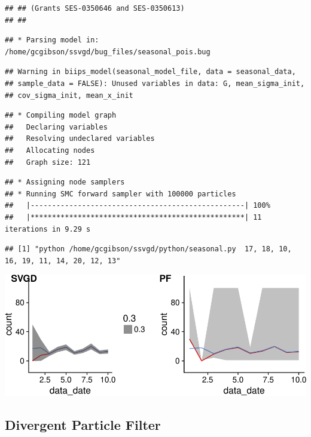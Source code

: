 \documentclass[]{article}
\begin{document}
\begin{verbatim}
## ## (Grants SES-0350646 and SES-0350613)
## ##
\end{verbatim}

\begin{verbatim}
## * Parsing model in: /home/gcgibson/ssvgd/bug_files/seasonal_pois.bug
\end{verbatim}

\begin{verbatim}
## Warning in biips_model(seasonal_model_file, data = seasonal_data,
## sample_data = FALSE): Unused variables in data: G, mean_sigma_init,
## cov_sigma_init, mean_x_init
\end{verbatim}

\begin{verbatim}
## * Compiling model graph
##   Declaring variables
##   Resolving undeclared variables
##   Allocating nodes
##   Graph size: 121
\end{verbatim}

\begin{verbatim}
## * Assigning node samplers
## * Running SMC forward sampler with 100000 particles
##   |--------------------------------------------------| 100%
##   |**************************************************| 11 iterations in 9.29 s
\end{verbatim}

\begin{verbatim}
## [1] "python /home/gcgibson/ssvgd/python/seasonal.py  17, 18, 10, 16, 19, 11, 14, 20, 12, 13"
\end{verbatim}

\includegraphics{ssvgd_files/figure-latex/unnamed-chunk-3-1.pdf}

\subsection{Divergent Particle Filter}\label{divergent-particle-filter}
\end{document}
